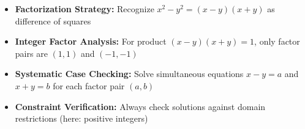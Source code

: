 \begin{takeaways}
\begin{itemize}
\item \textbf{Factorization Strategy:} Recognize $x^2 - y^2 = (x-y)(x+y)$ as difference of squares
\item \textbf{Integer Factor Analysis:} For product $(x-y)(x+y) = 1$, only factor pairs are $(1,1)$ and $(-1,-1)$
\item \textbf{Systematic Case Checking:} Solve simultaneous equations $x-y = a$ and $x+y = b$ for each factor pair $(a,b)$
\item \textbf{Constraint Verification:} Always check solutions against domain restrictions (here: positive integers)
\end{itemize}
\end{takeaways}
